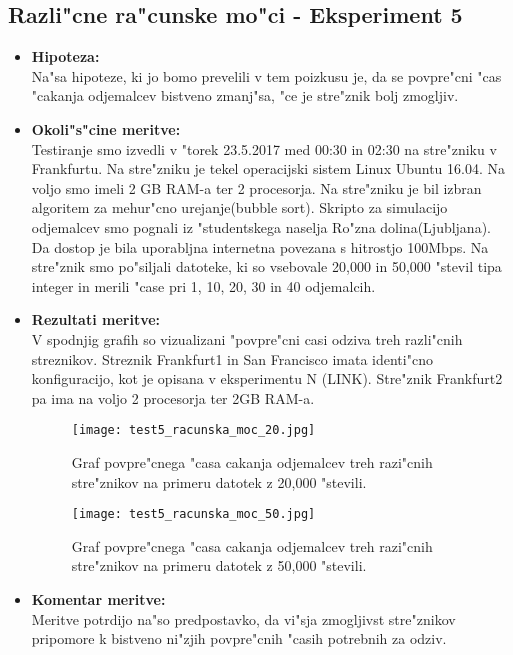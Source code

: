 \subsection{Razli"cne ra"cunske mo"ci - Eksperiment 5}
\begin{itemize}
	\item \textbf{Hipoteza: }  \\
		Na"sa hipoteze, ki jo bomo prevelili v tem poizkusu je, da se povpre"cni "cas "cakanja odjemalcev bistveno zmanj"sa, "ce je stre"znik bolj zmogljiv.
			
	\item \textbf{Okoli"s"cine meritve: } \\
		Testiranje smo izvedli v "torek 23.5.2017 med 00:30 in 02:30 na stre"zniku v Frankfurtu. Na stre"zniku je tekel operacijski sistem Linux Ubuntu 16.04. Na voljo smo imeli 2 GB RAM-a ter 2 procesorja. Na stre"zniku je bil izbran algoritem za mehur"cno urejanje(bubble sort). Skripto za simulacijo odjemalcev smo pognali iz "studentskega naselja Ro"zna dolina(Ljubljana). Da dostop je bila uporabljna internetna povezana s hitrostjo 100Mbps. 
		Na stre"znik smo po"siljali datoteke, ki so vsebovale 20,000 in 50,000 "stevil tipa integer in merili "case pri 1, 10, 20, 30 in 40 odjemalcih.

 	\item \textbf{Rezultati meritve: }  \\
		V spodnjig grafih so vizualizani "povpre"cni casi odziva treh razli"cnih streznikov. Streznik Frankfurt1 in San Francisco imata identi"cno konfiguracijo, kot je opisana v eksperimentu N (LINK). Stre"znik Frankfurt2 pa ima na voljo 2 procesorja ter 2GB RAM-a. 
		\begin{figure}[!h]
  		\centering
  		  \texttt{[image: test5\_racunska\_moc\_20.jpg]}
  		\caption{Graf povpre"cnega "casa cakanja odjemalcev treh razi"cnih stre"znikov na primeru datotek z 20,000 "stevili.}
  		\label{8_graf_racunska_moc_20}
		\end{figure}

	\begin{figure}[!h]
  		\centering
  		  \texttt{[image: test5\_racunska\_moc\_50.jpg]}
  		\caption{Graf povpre"cnega "casa cakanja odjemalcev treh razi"cnih stre"znikov na primeru datotek z 50,000 "stevili.}
  		\label{8_graf_racunska_moc_50}
		\end{figure}

	\item \textbf{Komentar meritve: } \\ 
		Meritve potrdijo na"so predpostavko, da vi"sja zmogljivst stre"znikov pripomore k bistveno ni"zjih povpre"cnih "casih potrebnih za odziv.



\end{itemize}





